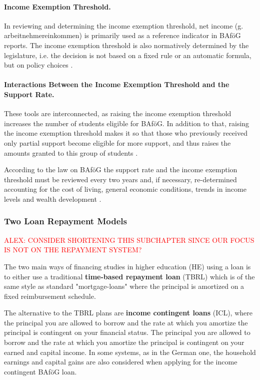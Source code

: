 \paragraph{Income Exemption Threshold.}
In reviewing and determining the income exemption threshold, net income (g. arbeitnehmereinkommen) is primarily used as a reference indicator in BAföG reports. The income exemption threshold is also normatively determined by the legislature, i.e. the decision is not based on a fixed rule or an automatic formula, but on policy choices \citep{meier_bafog_2024}.


\paragraph{Interactions Between the Income Exemption Threshold and the Support Rate.}
These tools are interconnected, as raising the income exemption threshold increases the number of students eligible for BAföG. In addition to that, raising the income exemption threshold makes it so that those who previously received only partial support become eligible for more support, and thus raises the amounts granted to this group of students \citep{meier_bafog_2024}.

According to the law on BAföG the support rate and the income exemption threshold must be reviewed every two years and, if necessary, re-determined accounting for the cost of living, general economic conditions, trends in income levels and wealth development \citep{meier_bafog_2024}.

\subsubsection{Two Loan Repayment Models}
\label{subsection:loan-repayment-plan}

\textcolor{red}{ALEX: CONSIDER SHORTENING THIS SUBCHAPTER SINCE OUR FOCUS IS NOT ON THE REPAYMENT SYSTEM?}

The two main ways of financing studies in higher education (HE) using a loan is to either use a traditional 
\textbf{time-based repayment loan} (TBRL) which is of the same style as standard "mortgage-loans" 
where the principal is amortized on a fixed reimbursement schedule.

The alternative to the TBRL plans are \textbf{income contingent loans} (ICL), where the 
principal you are allowed to borrow and the rate at which you amortize the principal is contingent on your financial status. The principal you are allowed to borrow and the 
rate at which you amortize the principal is contingent on your earned 
and capital income. In some systems, as in the German one, the household earnings 
and capital gains are also considered when applying for the income contingent BAföG loan.

